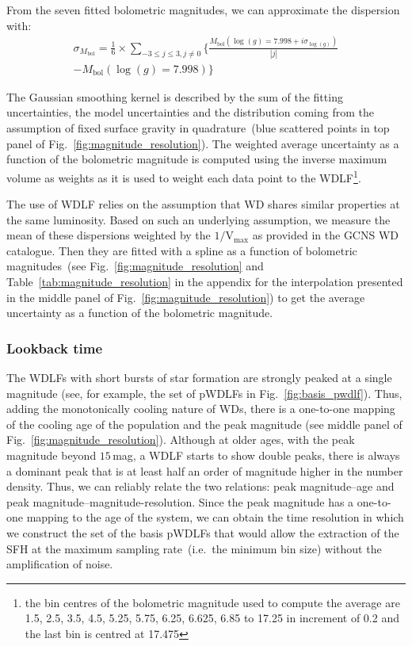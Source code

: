 \documentclass[fleqn,usenatbib]{mnras}
\begin{document}
From the seven fitted
bolometric magnitudes, we can approximate the dispersion with:
\begin{multline}
  \sigma_{M_{\mathrm{bol}}} = \frac{1}{6} \times \sum_{-3 \leq j \leq 3, j \neq 0} \Biggl\{ \frac{M_{\mathrm{bol}}(\log(g)=7.998 + i\sigma_{\log(g)})}{|j|} \\
  - M_{\mathrm{bol}}(\log(g)=7.998) \Biggr\}
\end{multline}


The Gaussian smoothing kernel is described by the sum of the fitting
uncertainties, the model uncertainties and the distribution coming from the
assumption of fixed surface gravity in quadrature~(blue scattered points in top
panel of Fig.~\ref{fig:magnitude_resolution}). The weighted average uncertainty
as a function of the bolometric magnitude is computed using the inverse maximum
volume as weights as it is used to weight each data point to the WDLF\footnote{
the bin centres of the bolometric magnitude used to compute the average are
1.5,  2.5,  3.5,  4.5,  5.25,  5.75,  6.25,  6.625, 6.85 to 17.25 in increment
of 0.2 and the last bin is centred at 17.475}.

The use of WDLF relies on the assumption that WD shares similar properties
at the same luminosity. Based on such an underlying assumption, we measure
the mean of these dispersions weighted by the $1/\mathrm{V}_{\mathrm{max}}$
as provided in the GCNS WD catalogue. Then they are fitted with a spline as
a function of bolometric magnitudes~(see Fig.~\ref{fig:magnitude_resolution}
and Table~\ref{tab:magnitude_resolution} in the appendix for the interpolation
presented in the middle panel of Fig.~\ref{fig:magnitude_resolution}) to get
the average uncertainty as a function of the bolometric magnitude.

\subsubsection{Lookback time}
The WDLFs with short bursts of star formation are strongly peaked at a single
magnitude (see, for example, the set of pWDLFs in Fig.~\ref{fig:basis_pwdlf}).
Thus, adding the monotonically cooling nature of WDs, there is a one-to-one
mapping of the cooling age of the population and the peak magnitude (see middle
panel of Fig.~\ref{fig:magnitude_resolution}). Although at older ages, with the
peak magnitude beyond $15$\,mag, a WDLF starts to show double peaks, there is
always a dominant peak that is at least half an order of magnitude higher in
the number density. Thus, we can reliably relate the two relations: peak
magnitude--age and peak magnitude--magnitude-resolution. Since the peak
magnitude has a one-to-one mapping to the age of the system, we can obtain the
time resolution in which we construct the set of the basis pWDLFs that would
allow the extraction of the SFH at the maximum sampling rate~(i.e.\ the minimum
bin size) without the amplification of noise.
\end{document}
